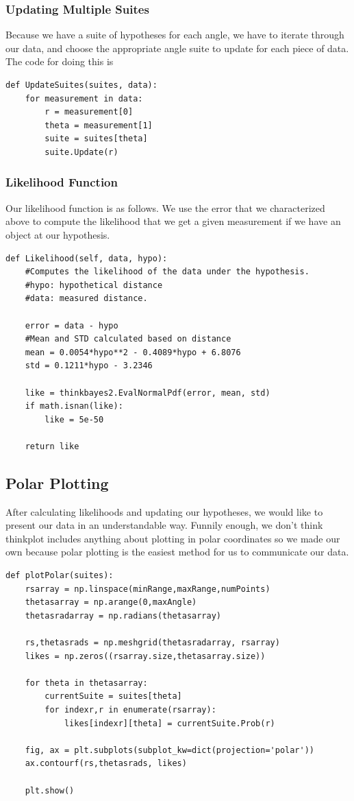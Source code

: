 \documentclass{article}
\begin{document}
\subsubsection{Updating Multiple Suites}
Because we have a suite of hypotheses for each angle, we have to iterate through our data, and choose the appropriate angle suite to update for each piece of data. The code for doing this is

\begin{lstlisting}
def UpdateSuites(suites, data):
    for measurement in data:
        r = measurement[0]
        theta = measurement[1]
        suite = suites[theta]
        suite.Update(r)
\end{lstlisting}

\subsubsection{Likelihood Function}
Our likelihood function is as follows. We use the error that we characterized above to compute the likelihood that we get a given measurement if we have an object at our hypothesis. 

\begin{lstlisting}
def Likelihood(self, data, hypo):
    #Computes the likelihood of the data under the hypothesis.
    #hypo: hypothetical distance
    #data: measured distance.
    
    error = data - hypo
    #Mean and STD calculated based on distance 
    mean = 0.0054*hypo**2 - 0.4089*hypo + 6.8076
    std = 0.1211*hypo - 3.2346

    like = thinkbayes2.EvalNormalPdf(error, mean, std)
    if math.isnan(like):
        like = 5e-50

    return like
\end{lstlisting}

\subsection{Polar Plotting}
After calculating likelihoods and updating our hypotheses, we would like to present our data in an understandable way. Funnily enough, we don't think thinkplot includes anything about plotting in polar coordinates so we made our own because polar plotting is the easiest method for us to communicate our data.
\begin{lstlisting}
def plotPolar(suites):
    rsarray = np.linspace(minRange,maxRange,numPoints)
    thetasarray = np.arange(0,maxAngle)
    thetasradarray = np.radians(thetasarray)

    rs,thetasrads = np.meshgrid(thetasradarray, rsarray)
    likes = np.zeros((rsarray.size,thetasarray.size))

    for theta in thetasarray:
        currentSuite = suites[theta]
        for indexr,r in enumerate(rsarray):
            likes[indexr][theta] = currentSuite.Prob(r)

    fig, ax = plt.subplots(subplot_kw=dict(projection='polar'))
    ax.contourf(rs,thetasrads, likes)

    plt.show()

\end{lstlisting}
\end{document}
